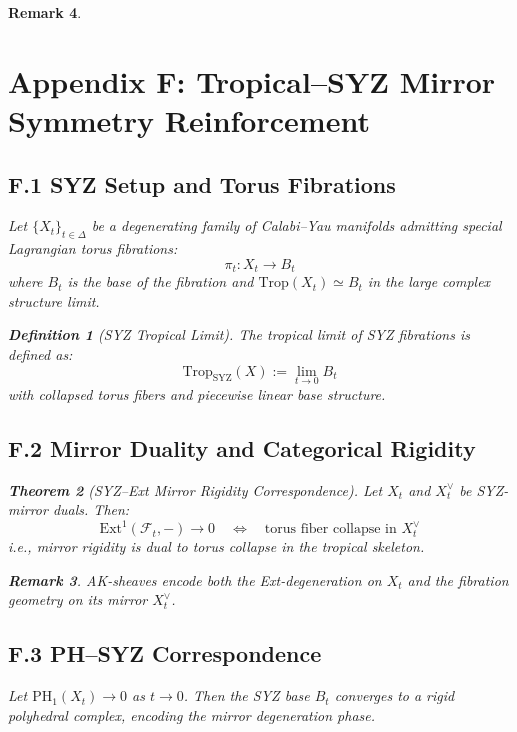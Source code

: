 \documentclass[11pt]{article}
\newtheorem{theorem}{Theorem}[section]
\newtheorem{definition}[theorem]{Definition}
\newtheorem{remark}[theorem]{Remark}
\begin{document}
\begin{remark}
\section*{Appendix F: Tropical–SYZ Mirror Symmetry Reinforcement}

\subsection*{F.1 SYZ Setup and Torus Fibrations}

Let \( \{X_t\}_{t \in \Delta} \) be a degenerating family of Calabi–Yau manifolds admitting special Lagrangian torus fibrations:
\[
\pi_t : X_t \to B_t
\]
where \( B_t \) is the base of the fibration and \( \mathrm{Trop}(X_t) \simeq B_t \) in the large complex structure limit.

\begin{definition}[SYZ Tropical Limit]
The tropical limit of SYZ fibrations is defined as:
\[
\mathrm{Trop}_{\mathrm{SYZ}}(X) := \lim_{t \to 0} B_t
\]
with collapsed torus fibers and piecewise linear base structure.
\end{definition}

\subsection*{F.2 Mirror Duality and Categorical Rigidity}

\begin{theorem}[SYZ–Ext Mirror Rigidity Correspondence]
Let \( X_t \) and \( X_t^\vee \) be SYZ-mirror duals. Then:
\[
\mathrm{Ext}^1(\mathcal{F}_t, -) \to 0 \quad \Leftrightarrow \quad \text{torus fiber collapse in } X_t^\vee
\]
i.e., mirror rigidity is dual to torus collapse in the tropical skeleton.
\end{theorem}

\begin{remark}
AK-sheaves encode both the Ext-degeneration on \( X_t \) and the fibration geometry on its mirror \( X_t^\vee \).
\end{remark}

\subsection*{F.3 PH–SYZ Correspondence}

\begin{proposition}
Let \( \mathrm{PH}_1(X_t) \to 0 \) as \( t \to 0 \). Then the SYZ base \( B_t \) converges to a rigid polyhedral complex, encoding the mirror degeneration phase.
\end{proposition}


\end{remark}
\end{document}
